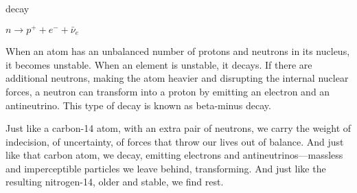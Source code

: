 
\begin{center}
\vspace*{\fill}
\Huge decay

\vspace{2cm}

\begin{flushright}
\large
\textit{ $n \rightarrow p^+ + e^- + \bar{\nu}_e$ }
\end{flushright}

\vspace*{\fill}
\end{center}

\normalsize

When an atom has an unbalanced number of protons and neutrons in its nucleus, it becomes unstable. When an element is unstable, it decays. If there are additional neutrons, making the atom heavier and disrupting the internal nuclear forces, a neutron can transform into a proton by emitting an electron and an antineutrino. This type of decay is known as beta-minus decay.

Just like a carbon-14 atom, with an extra pair of neutrons, we carry the weight of indecision, of uncertainty, of forces that throw our lives out of balance. And just like that carbon atom, we decay, emitting electrons and antineutrinos—massless and imperceptible particles we leave behind, transforming. And just like the resulting nitrogen-14, older and stable, we find rest.
